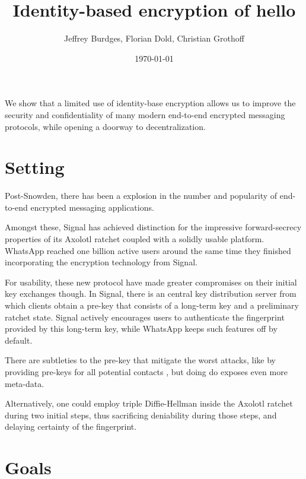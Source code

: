 \documentclass[twoside,letterpaper]{sig-alternate}
\title{Identity-based encryption of hello} %
\author{Jeffrey Burdges, Florian Dold, Christian Grothoff}
\date{\today}
\begin{document}
\maketitle


We show that a limited use of identity-base encryption allows us to
improve the security and confidentiality of many modern end-to-end
encrypted messaging protocols,
 while opening a doorway to decentralization. 

\section{Setting}

Post-Snowden, there has been a explosion in the number and popularity
of end-to-end encrypted messaging applications.\cite{}

Amongst these, Signal has achieved distinction for the impressive
forward-secrecy properties of its Axolotl ratchet\cite{TextSecure}
 coupled with a solidly usable platform.
WhatsApp reached one billion active users around the same time
they finished incorporating the encryption technology from Signal.
\cite{}

For usability, these new protocol have made greater compromises on
their initial key exchanges though.  In Signal, there is an central
key distribution server from which clients obtain a pre-key that
consists of a long-term key and a preliminary ratchet state.
%
Signal actively encourages users to authenticate the fingerprint
provided  by this long-term key, while WhatsApp keeps such features
off by default.

There are subtleties to the pre-key that mitigate the worst attacks,
like by providing pre-keys for all potential contacts
 \cite[\S4.3]{TextSecure}, but
doing do exposes even more meta-data.

Alternatively, one could employ triple Diffie-Hellman inside the
Axolotl ratchet during two initial steps,
 thus sacrificing deniability during those steps,
 and delaying certainty of the fingerprint. 

\section{Goals} 
\end{document}
